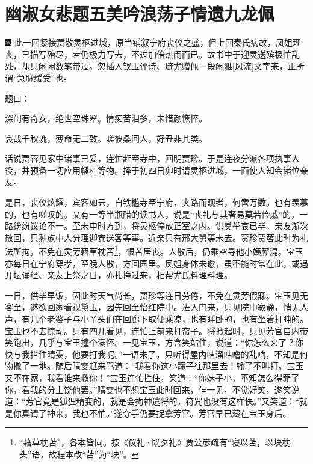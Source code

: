 

\chapter{幽淑女悲题五美吟\hspace{.5em}浪荡子情遗九龙佩}

{\includegraphics[width=3mm]{../Images/00005} \kaishu 此一回紧接贾敬灵柩进城，原当铺叙宁府丧仪之盛，但上回秦氏病故，凤姐理丧，已描写殆尽，若仍极力写去，不过加倍热闹而已。故书中于迎灵送殡极忙乱处，却只闲闲数笔带过。忽插入钗玉评诗、琏尤赠佩一段闲雅{[}风流{]}文字来，正所谓“急脉缓受”也。}

题曰：

\hspace{2em}深闺有奇女，绝世空珠翠。情痴苦泪多，未惜颜憔悴。

\hspace{2em}哀哉千秋魂，薄命无二致。嗟彼桑间人，好丑非其类。


话说贾蓉见家中诸事已妥，连忙赶至寺中，回明贾珍。于是连夜分派各项执事人役，并预备一切应用幡杠等物。择于初四日卯时请灵柩进城，一面使人知会诸位亲友。

是日，丧仪炫耀，宾客如云，自铁槛寺至宁府，夹路而观者，何啻万数。也有羡慕的，也有嗟叹的。又有一等半瓶醋的读书人，说是“丧礼与其奢易莫若俭戚”的，一路纷纷议论不一。至未申时方到，将灵柩停放正室之内。供奠举哀已毕，亲友渐次散回，只剩族中人分理迎宾送客等事。近亲只有邢大舅等未去。贾珍贾蓉此时为礼法所拘，不免在灵旁藉草枕苫\footnote{“藉草枕苫”，各本皆同。按《仪礼·既夕礼》贾公彦疏有“寝以苫，以块枕头”语，故程本改“苫”为“块”。}，恨苦居丧。人散后，仍乘空寻他小姨厮混。宝玉亦每日在宁府穿孝，至晚人散，方回园里。凤姐身体未愈，虽不能时常在此，或遇开坛诵经、亲友上祭之日，亦扎挣过来，相帮尤氏料理料理。

一日，供毕早饭，因此时天气尚长，贾珍等连日劳倦，不免在灵旁假寐。宝玉见无客至，遂欲回家看视黛玉，因先回至怡红院中。进入门来，只见院中寂静，悄无人声，有几个老婆子与小丫头们在回廊下取便乘凉，也有睡卧的，也有坐着打盹的。宝玉也不去惊动。只有四儿看见，连忙上前来打帘子。将掀起时，只见芳官自内带笑跑出，几乎与宝玉撞个满怀。一见宝玉，方含笑站住，说道：“你怎么来了？你快与我拦住晴雯，他要打我呢。”一语未了，只听得屋内咭溜咕噜的乱响，不知是何物撒了一地。随后晴雯赶来骂道：“我看你这小蹄子往那里去！输了不叫打。宝玉又不在家，我看谁来救你！”宝玉连忙拦住，笑道：“你妹子小，不知怎么得罪了你，看我的分上饶他罢。”晴雯也不想宝玉此时回来，乍一见，不觉好笑，遂笑说道：“芳官竟是狐狸精变的，就是会拘神遣将的，符咒也没有这样快。”又笑道：“就是你真请了神来，我也不怕。”遂夺手仍要捉拿芳官。芳官早已藏在宝玉身后。


